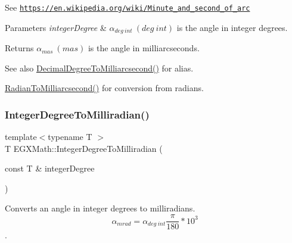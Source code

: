 See \href{https://en.wikipedia.org/wiki/Minute_and_second_of_arc}{\tt https\+://en.\+wikipedia.\+org/wiki/\+Minute\+\_\+and\+\_\+second\+\_\+of\+\_\+arc} 
\begin{DoxyParams}{Parameters}
{\em integer\+Degree} & $\alpha_{deg\ int}\ (deg\ int)$ is the angle in integer degrees. \\
\hline
\end{DoxyParams}
\begin{DoxyReturn}{Returns}
$\alpha_{mas}\ (mas)$ is the angle in milliarcseconds. 
\end{DoxyReturn}
\begin{DoxySeeAlso}{See also}
\mbox{\hyperlink{group___e_g_x_math-_angle_conversions-_decimal_degree_gadb9ff3c92cf7484793f91e7de80c222e}{Decimal\+Degree\+To\+Milliarcsecond()}} for alias. 

\mbox{\hyperlink{group___e_g_x_math-_angle_conversions-_radian_ga84fbb494a455cfeb30be62776f96c9a9}{Radian\+To\+Milliarcsecond()}} for conversion from radians. 
\end{DoxySeeAlso}
\mbox{\label{group___e_g_x_math-_angle_conversions-_integer_degree_ga5379a68bdff5cc4fab5bb1ba06ef9453}} 
\subsubsection{\texorpdfstring{Integer\+Degree\+To\+Milliradian()}{IntegerDegreeToMilliradian()}}
{\footnotesize\ttfamily template$<$typename T $>$ \\
T E\+G\+X\+Math\+::\+Integer\+Degree\+To\+Milliradian (\begin{DoxyParamCaption}\item[{const T \&}]{integer\+Degree }\end{DoxyParamCaption})}



Converts an angle in integer degrees to milliradians. \[\alpha_{mrad}=\alpha_{deg\ int}\frac{\pi}{180}*10^3\]. 

